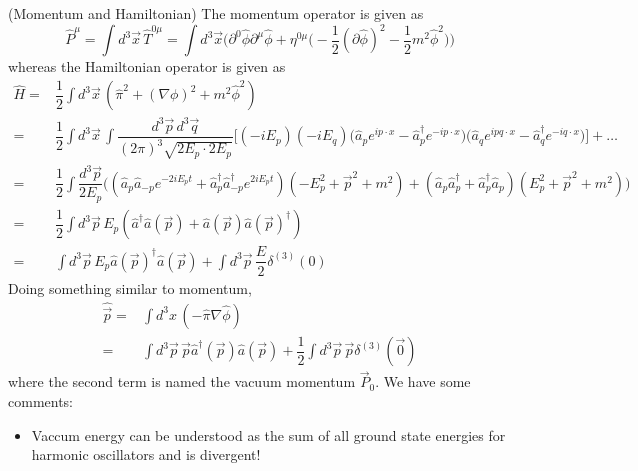 \begin{defi}
(Momentum and Hamiltonian) The momentum operator is given as
\[\hat{P}^{\mu }=\int d^3\vec{x}\,\hat{T}^{0\mu }=\int d^3\vec{x}\Big(\partial ^{0}\hat{\phi }\partial ^{\mu }\hat{\phi }+\eta ^{0\mu }\Big(-\dfrac{1}{2}(\partial \hat{\phi })^2-\dfrac{1}{2}m^2\hat{\phi }^2\Big)\Big)\]
whereas the Hamiltonian operator is given as
\[\begin{align*}
\hat{H}=&\dfrac{1}{2}\int d^3\vec{x}\,(\hat{\pi }^2+(\nabla \phi )^2+m^2\hat{\phi }^2)\\
=&\dfrac{1}{2}\int d^3\vec{x}\,\int \dfrac{d^3\vec{p}\,d^3\vec{q}}{(2\pi )^3\sqrt{2E_{p}\cdot 2E_{p}}}\Big[(-iE_{p})(-iE_{q})\Big(\hat{a}_{p}e^{ip\cdot x}-\hat{a}_{p}^{\dagger}e^{-ip\cdot x}\Big)\Big(\hat{a}_{q}e^{ipq\cdot x}-\hat{a}^{\dagger}_{q}e^{-iq\cdot x}\Big)\Big]+\ldots \\
=&\dfrac{1}{2}\int \dfrac{d^3\vec{p}}{2E_{p}}\Big((\hat{a}_{p}\hat{a}_{-p}e^{-2iE_{p}t}+\hat{a}_{p}^{\dagger}\hat{a}_{-p}^{\dagger}e^{2iE_{p}t})(-E_{p}^2+\vec{p}^2+m^2)+(\hat{a}_{p}\hat{a}_{p}^{\dagger}+\hat{a}_{p}^{\dagger}\hat{a}_{p})(E_{p}^2+\vec{p}^2+m^2)\Big)\\
=&\dfrac{1}{2}\int d^3\vec{p}\,E_{p}(\hat{a}^{\dagger}\hat{a}(\vec{p})+\hat{a}(\vec{p})\hat{a}(\vec{p})^{\dagger})\\
=&\int d^3\vec{p}\,E_{p}\hat{a}(\vec{p})^{\dagger}\hat{a}(\vec{p})+\int d^3\vec{p}\,\dfrac{E}{2}\delta ^{(3)}(0)
\end{align*}\]
Doing something similar to momentum,
\[\begin{align*}
\hat{\vec{p}}=&\int d^3x\,(-\hat{\pi }\nabla \hat{\phi })\\
=&\int d^3\vec{p}\,\vec{p}\hat{a}^{\dagger}(\vec{p})\hat{a}(\vec{p})+\dfrac{1}{2}\int d^3\vec{p}\,\vec{p}\delta ^{(3)}(\vec{0})
\end{align*}\]
where the second term is named the vacuum momentum $\vec{P}_{0}$. We have some comments:
\begin{itemize}
\item[(i)] Vaccum energy can be understood as the sum of all ground state energies for harmonic oscillators and is divergent!
\end{itemize}
\end{defi}
\vspace{2ex}

